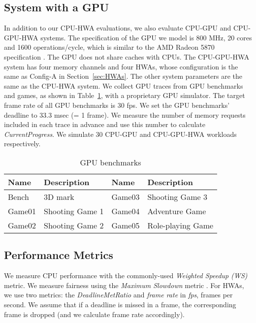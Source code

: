 \documentclass[10pt,letterpaper]{article}
\begin{document}
\subsection{System with a GPU}
In addition to our CPU-HWA evaluations, we also evaluate CPU-GPU
and CPU-GPU-HWA systems. The specification of the GPU we model is
800 MHz, 20 cores and 1600 operations/cycle, which is similar to
the AMD Radeon 5870 specification \cite{amd-radeon}. The GPU does
not share caches with CPUs. The CPU-GPU-HWA system has four memory
channels and four HWAs, whose configuration is the same as Config-A
in Section~\ref{sec:HWAs}. The other system parameters are the
same as the CPU-HWA system. We collect GPU traces from GPU
benchmarks and games, as shown in Table~\ref{tab:gpu-bench}, with
a proprietary GPU simulator. The target frame rate of all GPU
benchmarks is 30 fps. We set the GPU benchmarks' deadline to 33.3
msec (= 1 frame). 
We measure the number of memory requests included in each trace in advance and
use this number to calculate \emph{CurrentProgress}. We simulate 
30 CPU-GPU and CPU-GPU-HWA workloads respectively.



\begin{table}[h!]
\footnotesize
  \centering
  \begin{tabular}{|l|l||l|l|}
    \hline
    Name & Description & Name & Description \\
    \hline
    \hline
    Bench & 3D mark & Game03 & Shooting Game 3 \\
    \hline
    Game01 & Shooting Game 1 & Game04 & Adventure Game \\
    \hline
    Game02 & Shooting Game 2 & Game05 & Role-playing Game \\
    \hline
  \end{tabular}
  \vspace{-2mm}
  \caption{GPU benchmarks}
  \label{tab:gpu-bench}
\end{table}





\subsection{Performance Metrics} We measure CPU performance with the
commonly-used \emph{Weighted Speedup (WS)}~\cite{weighted-speedup,ws} metric. We
measure fairness using the \emph{Maximum Slowdown} metric \cite{max-slowdown,
atlas, tcm}. For HWAs, we use two metrics: the \emph{DeadlineMetRatio} and
\emph{frame rate} in \emph{fps}, frames per second. We assume that if a deadline
is missed in a frame, the corresponding frame is dropped (and we calculate frame
rate accordingly).
\end{document}
